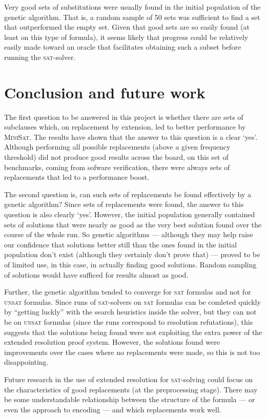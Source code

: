 \documentclass[proof,pdftex,11pt,a4,titlepage]{article}
\newcommand{\sat}{\textsc{sat}}
\newcommand{\unsat}{\textsc{unsat}}
\begin{document}
Very good sets of substitutions were usually found in the initial population of the genetic algorithm. That is, a random sample of 50 sets was sufficient to find a set that outperformed the empty set. Given that good sets are so easily found (at least on this type of formula), it seems likely that progress could be relatively easily made toward an oracle that facilitates obtaining such a subset before running the \sat{}-solver.

\section{Conclusion and future work}

The first question to be answered in this project is whether there are sets of subclauses which, on replacement by extension, led to better performance by \textsc{MiniSat}. The results have shown that the answer to this question is a clear `yes'. Although performing all possible replacements (above a given frequency threshold) did not produce good results across the board, on this set of benchmarks, coming from sofware verification, there were always sets of replacements that led to a performance boost.

The second question is, can such sets of replacements be found effectively by a genetic algorithm? Since sets of replacements were found, the answer to this question is also clearly `yes'. However, the initial population generally contained sets of solutions that were nearly as good as the very best solution found over the course of the whole run. So genetic algorithms --- although they may help raise our confidence that solutions better still than the ones found in the initial population don't exist (although they certainly don't prove that) --- proved to be of limited use, in this case, in actually finding good solutions. Random sampling of solutions would have sufficed for results almost as good.

Further, the genetic algorithm tended to converge for \sat{} formulas and not for \unsat{} formulas. Since runs of \sat{}-solvers on \sat{} formulas can be comleted quickly by ``getting luckly'' with the search heuristics inside the solver, but they can not be on \unsat{} formulas (since the runs correspond to resolution refutations), this suggests that the solutions being found were not exploiting the extra power of the extended resolution proof system. However, the solutions found were improvements over the cases where no replacements were made, so this is not too disappointing.

Future research in the use of extended resolution for \sat{}-solving could focus on the characteristics of good replacements (at the preprocessing stage). There may be some understandable relationship between the structure of the formula --- or even the approach to encoding --- and which replacements work well.

\FloatBarrier
\newpage




\newpage

\end{document}
